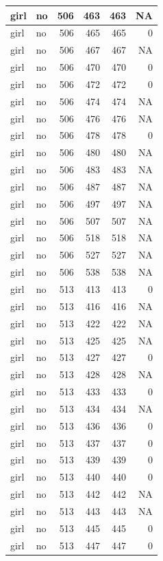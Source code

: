 \documentclass[man]{apa6}
\begin{document}
\begin{tabular}{l|l|r|r|r|r}
\hline
girl & no & 506 & 463 & 463 & NA\\
\hline
girl & no & 506 & 465 & 465 & 0\\
\hline
girl & no & 506 & 467 & 467 & NA\\
\hline
girl & no & 506 & 470 & 470 & 0\\
\hline
girl & no & 506 & 472 & 472 & 0\\
\hline
girl & no & 506 & 474 & 474 & NA\\
\hline
girl & no & 506 & 476 & 476 & NA\\
\hline
girl & no & 506 & 478 & 478 & 0\\
\hline
girl & no & 506 & 480 & 480 & NA\\
\hline
girl & no & 506 & 483 & 483 & NA\\
\hline
girl & no & 506 & 487 & 487 & NA\\
\hline
girl & no & 506 & 497 & 497 & NA\\
\hline
girl & no & 506 & 507 & 507 & NA\\
\hline
girl & no & 506 & 518 & 518 & NA\\
\hline
girl & no & 506 & 527 & 527 & NA\\
\hline
girl & no & 506 & 538 & 538 & NA\\
\hline
girl & no & 513 & 413 & 413 & 0\\
\hline
girl & no & 513 & 416 & 416 & NA\\
\hline
girl & no & 513 & 422 & 422 & NA\\
\hline
girl & no & 513 & 425 & 425 & NA\\
\hline
girl & no & 513 & 427 & 427 & 0\\
\hline
girl & no & 513 & 428 & 428 & NA\\
\hline
girl & no & 513 & 433 & 433 & 0\\
\hline
girl & no & 513 & 434 & 434 & NA\\
\hline
girl & no & 513 & 436 & 436 & 0\\
\hline
girl & no & 513 & 437 & 437 & 0\\
\hline
girl & no & 513 & 439 & 439 & 0\\
\hline
girl & no & 513 & 440 & 440 & 0\\
\hline
girl & no & 513 & 442 & 442 & NA\\
\hline
girl & no & 513 & 443 & 443 & NA\\
\hline
girl & no & 513 & 445 & 445 & 0\\
\hline
girl & no & 513 & 447 & 447 & 0\\

\end{tabular}
\end{document}
